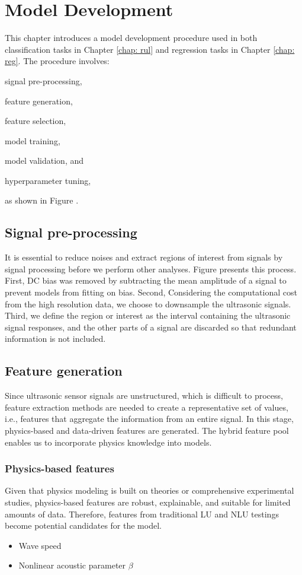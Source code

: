 \chapter{Model Development}
\label{chap: model}

This chapter introduces a model development procedure used in both classification tasks in Chapter \ref{chap: rul} and regression tasks in Chapter \ref{chap: reg}. The procedure involves:
\begin{enumerate*}[label=\itshape\alph*\upshape)]
    \item signal pre-processing,
    \item feature generation,
    \item feature selection,
    \item model training,
    \item model validation, and
    \item hyperparameter tuning,
\end{enumerate*}
as shown in Figure .

\section{Signal pre-processing}
It is essential to reduce noises and extract regions of interest from signals by signal processing before we perform other analyses. Figure presents this process. First, DC bias was removed by subtracting the mean amplitude of a signal to prevent models from fitting on bias. Second, Considering the computational cost from the high resolution data, we choose to downsample the ultrasonic signals. Third, we define the region or interest as the interval containing the ultrasonic signal responses, and the other parts of a signal are discarded so that redundant information is not included.

\section{Feature generation}
Since ultrasonic sensor signals are unstructured, which is difficult to process, feature extraction methods are needed to create a representative set of values, i.e., features that aggregate the information from an entire signal. In this stage, physics-based and data-driven features are generated. The hybrid feature pool enables us to incorporate physics knowledge into models.

\subsection{Physics-based features}
Given that physics modeling is built on theories or comprehensive experimental studies, physics-based features are robust, explainable, and suitable for limited amounts of data. Therefore, features from traditional LU and NLU testings become potential candidates for the model.
\begin{itemize}
    \item Wave speed
    \item Nonlinear acoustic parameter $\beta$
\end{itemize}

